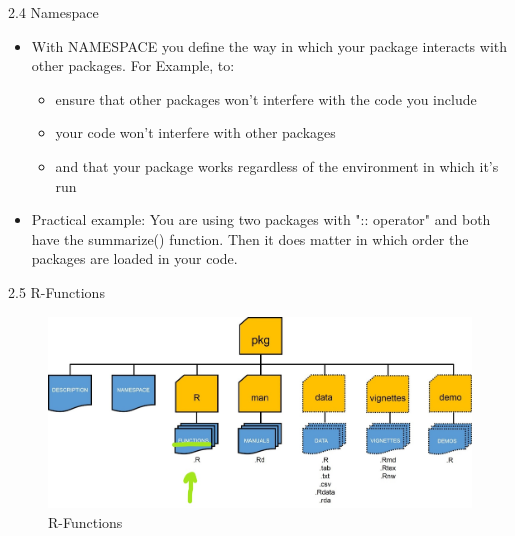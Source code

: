 \documentclass[11pt,a4paper]{beamer}
\begin{document}
\begin{frame}[t]{2.4 Namespace}
	
	\begin{itemize}
		\item With NAMESPACE you define  the way in which your package interacts with other packages. For Example, to:
		\begin{itemize}
			\item ensure that other	packages won’t	interfere	with the code you include 
			\item	your code	won’t	interfere	with	other	packages 	
			\item and	that	your	package	works	regardless	of	the
			environment	in	which	it’s	run
		\end{itemize}
		
		
		\item Practical example: You are using two packages with "::	operator" and both have the summarize() function. Then it does matter in which order the packages are loaded in your code. 
		
	\end{itemize}
	
\end{frame}






\begin{frame}[t]{2.5 R-Functions}
	
	
	\begin{figure}
		\centering
		\includegraphics[width=0.9\linewidth]{Rfunc}
		\caption{R-Functions}
		\label{fig:packages}
	\end{figure}
	
	
\end{frame}
\end{document}
